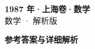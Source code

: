 \documentclass[zihao=-4, a4paper]{ctexart}
\begin{document}
\begin{center}
  {\Large\bfseries 1987 年·上海卷·数学}\\[4pt]
  {\large 数学 · 解析版}
\end{center}
\medskip
{}

\clearpage
{}
\begin{center}{\Large\bfseries 参考答案与详细解析}\end{center}
\medskip

\end{document}
